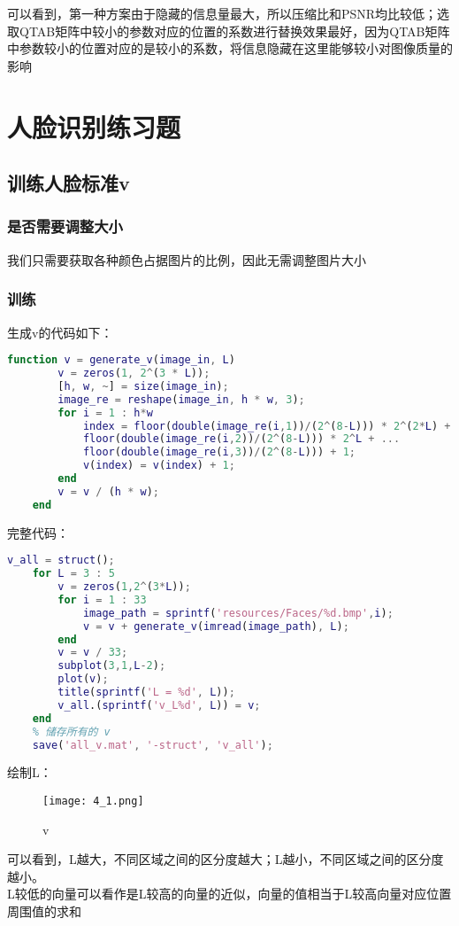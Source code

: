 \documentclass[12pt]{article}
\begin{document}
可以看到，第一种方案由于隐藏的信息量最大，所以压缩比和PSNR均比较低；选取QTAB矩阵中较小的参数对应的位置的系数进行替换效果最好，因为QTAB矩阵中参数较小的位置对应的是较小的系数，将信息隐藏在这里能够较小对图像质量的影响

\section{人脸识别练习题}
\subsection{训练人脸标准v }
\subsubsection{是否需要调整大小}
我们只需要获取各种颜色占据图片的比例，因此无需调整图片大小
\subsubsection{训练}
生成v的代码如下：
\begin{lstlisting}[language=matlab]
    function v = generate_v(image_in, L)
        v = zeros(1, 2^(3 * L));
        [h, w, ~] = size(image_in);
        image_re = reshape(image_in, h * w, 3);
        for i = 1 : h*w
            index = floor(double(image_re(i,1))/(2^(8-L))) * 2^(2*L) + ... 
            floor(double(image_re(i,2))/(2^(8-L))) * 2^L + ... 
            floor(double(image_re(i,3))/(2^(8-L))) + 1;
            v(index) = v(index) + 1;
        end
        v = v / (h * w);
    end
\end{lstlisting}

完整代码：
\begin{lstlisting}[language=matlab]
    v_all = struct();
    for L = 3 : 5
        v = zeros(1,2^(3*L));
        for i = 1 : 33
            image_path = sprintf('resources/Faces/%d.bmp',i);
            v = v + generate_v(imread(image_path), L);
        end
        v = v / 33;
        subplot(3,1,L-2);
        plot(v);
        title(sprintf('L = %d', L));
        v_all.(sprintf('v_L%d', L)) = v;
    end
    % 储存所有的 v
    save('all_v.mat', '-struct', 'v_all');
\end{lstlisting}

绘制L：
\begin{figure}[H]
    \centering
    \texttt{[image: 4\_1.png]}
    \caption{v}
\end{figure}

可以看到，L越大，不同区域之间的区分度越大；L越小，不同区域之间的区分度越小。\\
\hspace*{2em} L较低的向量可以看作是L较高的向量的近似，向量的值相当于L较高向量对应位置周围值的求和
\end{document}
